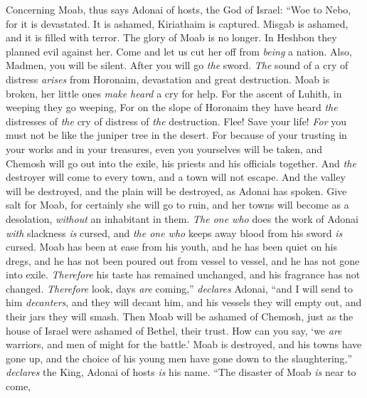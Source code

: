 \begin{biblechapter} %
 Concerning Moab, thus says Adonai of hosts, the God of Israel:
\verse “Woe to Nebo, 
for it is devastated. 
It is ashamed, 
Kiriathaim is captured. 
Misgab is ashamed, 
and it is filled with terror.
\verse The glory of Moab is no longer. 
In Heshbon they planned evil against her. 
Come and let us cut her off from \textit{being} a nation. 
Also, Madmen, you will be silent. 
After you will go \textit{the} sword.
\verse \textit{The} sound of a cry of distress \textit{arises} from Horonaim, 
devastation and great destruction.
\verse Moab is broken, 
her little ones \textit{make heard} a cry for help.
\verse For the ascent of Luhith, 
in weeping they go weeping, 
For on the slope of Horonaim they have heard 
\textit{the} distresses of \textit{the} cry of distress of \textit{the} destruction.
\verse Flee! Save your life! 
\textit{For} you must not be like the juniper tree in the desert.
\verse For because of your trusting in your works and in your treasures, 
even you yourselves will be taken, 
and Chemosh will go out into the exile, 
his priests and his officials together.
\verse And \textit{the} destroyer will come to every town, 
and a town will not escape. 
And the valley will be destroyed, 
and the plain will be destroyed, as Adonai has spoken.
\verse Give salt for Moab, 
for certainly she will go to ruin, 
and her towns will become as a desolation, 
\textit{without} an inhabitant in them.
\verse \textit{The one who} does the work of Adonai \textit{with} slackness \textit{is} cursed, 
and \textit{the one who} keeps away blood from his sword \textit{is} cursed.
\verse Moab has been at ease from his youth, 
and he has been quiet on his dregs, 
and he has not been poured out from vessel to vessel, 
and he has not gone into exile. 
\textit{Therefore} his taste has remained unchanged, 
and his fragrance has not changed.
\verse \textit{Therefore} look, days \textit{are} coming,” \textit{declares} Adonai, 
“and I will send to him \textit{decanters}, 
and they will decant him, 
and his vessels they will empty out, 
and their jars they will smash.
\verse Then Moab will be ashamed of Chemosh, 
just as the house of Israel were ashamed of Bethel, their trust.
\verse How can you say, ‘we \textit{are} warriors, 
and men of might for the battle.’
\verse Moab is destroyed, 
and his towns have gone up, 
and the choice of his young men have gone down to the slaughtering,” 
\textit{declares} the King, Adonai of hosts \textit{is} his name.
\verse “The disaster of Moab \textit{is} near to come, 

\end{biblechapter}

